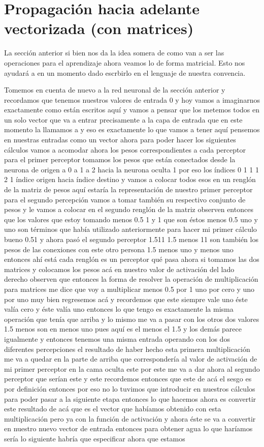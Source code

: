 \section{Propagación hacia adelante vectorizada (con matrices)}

 La sección anterior si bien nos da la idea somera de como van a ser las operaciones para el aprendizaje ahora veamos lo de forma matricial. Esto nos ayudará a en un momento dado escrbirlo en el lenguaje de nuestra convencia.
 
 Tomemos en cuenta de nuevo a la red neuronal  de la sección anterior y recordamos que  tenemos nuestros valores de entrada 0 y hoy vamos a imaginarnos  exactamente como están escritos aquí y vamos a pensar que los metemos todos en un solo vector que va a entrar precisamente a la capa de entrada que en este momento la llamamos a y eso es exactamente lo que vamos a tener aquí pensemos en nuestras entradas como un vector ahora para poder hacer los siguientes cálculos vamos a acomodar ahora los pesos correspondientes a cada perceptor para el primer perceptor tomamos los pesos que están conectados desde la neurona de origen a 0 a 1 a 2 hacia la neurona oculta 1 por eso los índices 0 1 1 1 2 1 índice origen hacia índice destino y vamos a colocar todos esos en un renglón de la matriz de pesos aquí estaría la representación de nuestro primer perceptor para el segundo percepción vamos a tomar también su respectivo conjunto de pesos y le vamos a colocar en el segundo renglón de la matriz observen entonces que los valores que estoy tomando menos 0.5 1 y 1 que son éstos menos 0.5 uno y uno son términos que había utilizado anteriormente para hacer mi primer cálculo bueno 0.51 y ahora pasó el segundo perceptor 1.511 1.5 menos 11 son también los pesos de las conexiones con este otro persona 1.5 menos uno y menos uno entonces ahí está cada renglón es un perceptor qué pasa ahora si tomamos las dos matrices y colocamos los pesos acá en nuestro valor de activación del lado derecho observen que entonces la forma de resolver la operación de multiplicación para matrices me dice que voy a multiplicar menos 0.5 por 1 uno por cero y uno por uno muy bien regresemos acá y recordemos que este siempre vale uno éste valía cero y éste valía uno entonces lo que tengo es exactamente la misma operación que tenía que arriba y lo mismo me va a pasar con los otros dos valores 1.5 menos son en menos uno pues aquí es el menos el 1.5 y los demás parece igualmente y entonces tenemos una misma entrada operando con los dos diferentes percepciones el resultado de haber hecho esta primera multiplicación me va a quedar en la parte de arriba que correspondería al valor de activación de mi primer perceptor en la cama oculta este por este me va a dar ahora al segundo perceptor que serían este y este recordemos entonces que este de acá el sesgo es por definición entonces por eso no lo tuvimos que introducir en nuestros cálculos para poder pasar a la siguiente etapa entonces lo que hacemos ahora es convertir este resultado de acá que es el vector que habíamos obtenido con esta multiplicación pero ya con la función de activación y ahora éste se va a convertir en nuestro nuevo vector de entrada entonces para obtener agua lo que haríamos sería lo siguiente habría que especificar ahora que estamos 